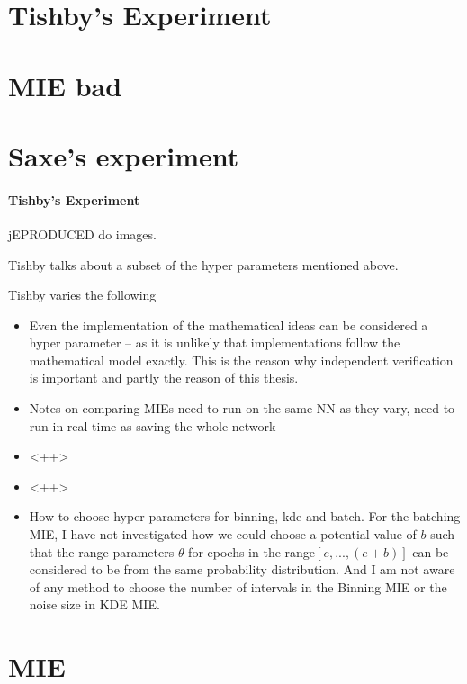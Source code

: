 \documentclass[dissertation.tex]{subfiles}
\begin{document}
\section{Tishby's Experiment}

\section{MIE bad}

\section{Saxe's experiment}

\paragraph{Tishby's Experiment} 

jEPRODUCED do images.

Tishby\cite{TISBHY} talks about a subset of the hyper parameters mentioned
above. 

Tishby varies the following 
\begin{itemize}
  \item{
      Even the implementation of the mathematical ideas can be considered a
      hyper parameter -- as it is unlikely that implementations follow the
      mathematical model exactly. This is the reason why independent
      verification is important and partly the reason of this thesis.
    }
  \item{
      Notes on comparing MIEs need to run on the same NN as they vary, need to
      run in real time as saving the whole network
    }
  \item{
      <++>
    }
  \item{
      <++>
    }
  \item{
      How to choose hyper parameters for binning, kde and batch. For the
      batching MIE, I have not
      investigated how we could choose a potential value of $b$ such that the
      range parameters $\theta$ for epochs in the range$[e,...,(e+b)]$ can be
      considered to be from the same probability distribution. And I am not
      aware of any method to choose the number of intervals in the Binning MIE
      or the noise size in KDE MIE.
    }
\end{itemize}

\section{MIE}
\end{document}
